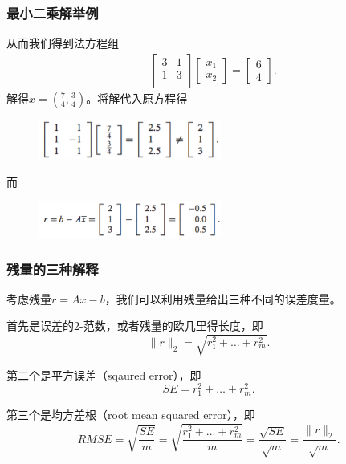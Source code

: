 \documentclass[10pt]{beamer}
\begin{document}
\begin{frame}
\frametitle{最小二乘解举例}
从而我们得到法方程组
\begin{align}
&\left[ \begin{array}{cc}
     3    & 1 \\
     1    &   3 \\                         
            \end{array} \right] 
\left[ \begin{array}{c} 
      x_1 \\ x_2 \end{array} \right] 
=
\left[ \begin{array}{c}
      6 \\4  \end{array} \right].
\end{align}
解得$\bar{x} = (\frac{7}{4}, \frac{3}{4})$。将解代入原方程得
\begin{figure}
\includegraphics[width=6cm]{figs/4-1-1_Example-1-1} 
\end{figure}
而
\begin{figure}
\includegraphics[width=6cm]{figs/4-1-1_Example-1-2} 
\end{figure}
\end{frame}


\begin{frame}
\frametitle{残量的三种解释}
考虑残量$r = Ax - b$，我们可以利用残量给出三种不同的误差度量。

\vspace{0.2cm}

首先是误差的2-范数，或者残量的欧几里得长度，即
\begin{equation}
\|r\|_2 = \sqrt{r_1^2 + \ldots +r_m^2}.
\end{equation}

第二个是平方误差（sqaured error），即
\begin{equation}
SE = r_1^2 + \ldots + r_m^2.
\end{equation}

第三个是均方差根（root mean squared error），即
\begin{equation}
RMSE = \sqrt{\frac{SE}{m}} = \sqrt{\frac{r_1^2 + \ldots + r_m^2}{m}} = \frac{\sqrt{SE}}{\sqrt{m}} = \frac{\|r\|_2}{\sqrt{m}}.
\end{equation}
\end{frame}
\end{document}
